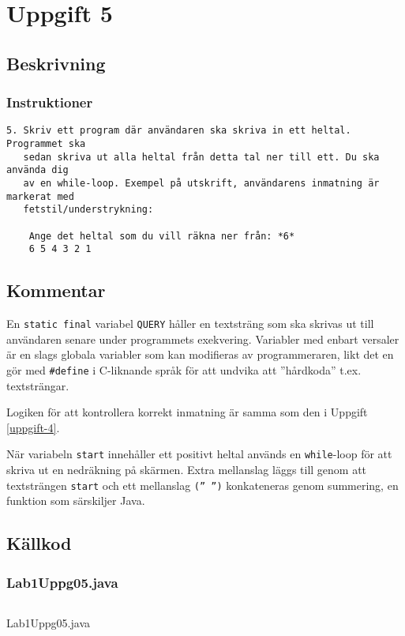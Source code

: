 \section{Uppgift 5}\label{uppgift-5}

\subsection{Beskrivning}
\subsubsection*{Instruktioner}
\begin{verbatim}
5. Skriv ett program där användaren ska skriva in ett heltal. Programmet ska
   sedan skriva ut alla heltal från detta tal ner till ett. Du ska använda dig
   av en while-loop. Exempel på utskrift, användarens inmatning är markerat med
   fetstil/understrykning:

    Ange det heltal som du vill räkna ner från: *6*
    6 5 4 3 2 1
\end{verbatim}

\subsection{Kommentar}
En \texttt{static final} variabel \texttt{QUERY} håller en textsträng som ska
skrivas ut till användaren senare under programmets exekvering.
Variabler med enbart versaler är en slags globala variabler som kan modifieras
av programmeraren, likt det en gör med \texttt{\#define} i C-liknande språk för
att undvika att ''hårdkoda'' t.ex. textsträngar.
\par Logiken för att kontrollera korrekt inmatning är samma som den i Uppgift
\ref{uppgift-4}.
\par När variabeln \texttt{start} innehåller ett positivt heltal används en
\texttt{while}-loop för att skriva ut en nedräkning på skärmen. Extra mellanslag
läggs till genom att textsträngen \texttt{start} och ett mellanslag 
\texttt{(''\ '')} konkateneras genom summering, en funktion som särskiljer Java.

\subsection{Källkod}\label{uppgift-5_src}
\subsubsection*{Lab1Uppg05.java}
    \inputminted[linenos]{java}{src/Lab1Uppg05.java}
    \caption{Lab1Uppg05.java}
    \label{Uppg5src}
